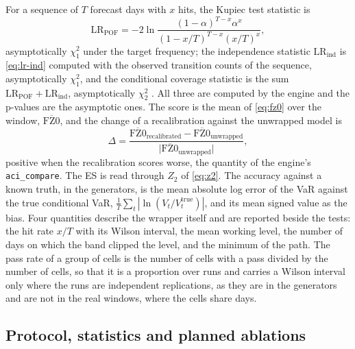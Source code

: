 For a sequence of $T$ forecast days with $x$ hits, the Kupiec test statistic is
\begin{equation}
\mathrm{LR}_{\mathrm{POF}} = -2\ln\frac{(1-\alpha)^{T-x}\alpha^{x}}{(1-x/T)^{T-x}(x/T)^{x}}, \label{eq:kupiec}
\end{equation}
asymptotically $\chi^2_1$ under the target frequency; the independence statistic $\mathrm{LR}_{\mathrm{ind}}$ is \cref{eq:lr-ind} computed with the observed transition counts of the sequence, asymptotically $\chi^2_1$, and the conditional coverage statistic is the sum $\mathrm{LR}_{\mathrm{POF}} + \mathrm{LR}_{\mathrm{ind}}$, asymptotically $\chi^2_2$ \citep{christoffersen1998,kupiec1995}. All three are computed by the engine and the p-values are the asymptotic ones. The score is the mean of \cref{eq:fz0} over the window, $\overline{\mathrm{FZ0}}$, and the change of a recalibration against the unwrapped model is
\begin{equation}
\Delta = \frac{\overline{\mathrm{FZ0}}_{\text{recalibrated}} - \overline{\mathrm{FZ0}}_{\text{unwrapped}}}{\bigl|\overline{\mathrm{FZ0}}_{\text{unwrapped}}\bigr|},
\label{eq:delta-fz0}
\end{equation}
positive when the recalibration scores worse, the quantity of the engine's \texttt{aci\_compare}. The ES is read through $Z_2$ of \cref{eq:z2}. The accuracy against a known truth, in the generators, is the mean absolute log error of the VaR against the true conditional VaR, $\frac{1}{T}\sum_t |\ln(V_t/V_t^{\mathrm{true}})|$, and its mean signed value as the bias. Four quantities describe the wrapper itself and are reported beside the tests: the hit rate $x/T$ with its Wilson interval, the mean working level, the number of days on which the band clipped the level, and the minimum of the path. The pass rate of a group of cells is the number of cells with a pass divided by the number of cells, so that it is a proportion over runs and carries a Wilson interval only where the runs are independent replications, as they are in the generators and are not in the real windows, where the cells share days.

\subsection{Protocol, statistics and planned ablations}
\label{sec:design-protocol}

